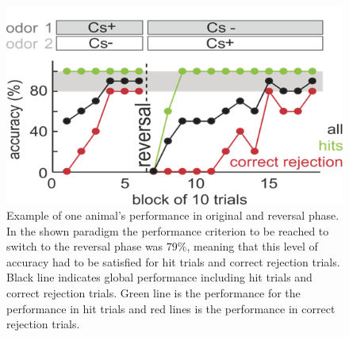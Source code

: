 \begin{figure}
    \centering
\includegraphics[scale=1]{figures/Performance.png}
\caption{Example of one animal's performance in original and reversal phase. In the shown paradigm the performance criterion to be reached to switch to the reversal phase was $79\%$, meaning that this level of accuracy had to be satisfied for hit trials and correct rejection trials. Black line indicates global performance including hit trials and correct rejection trials. Green line is the performance for the performance in hit trials and red lines is the performance in correct rejection trials.}
\label{fig:performance}
\end{figure}
